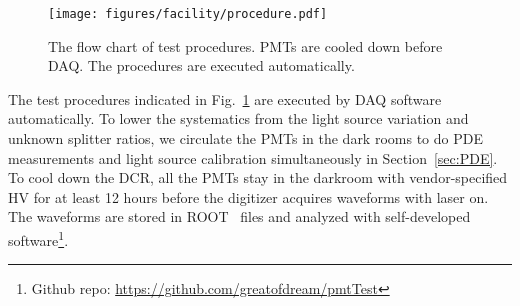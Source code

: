 \begin{figure}
    \centering
    \texttt{[image: figures/facility/procedure.pdf]}
    \caption{The flow chart of test procedures. PMTs are cooled down before DAQ. The procedures are executed automatically.}
    \label{fig:testingprocedure}
\end{figure}

The test procedures indicated in Fig.~\ref{fig:testingprocedure} are executed by DAQ software automatically. To lower the systematics from the light source variation and unknown splitter ratios, we circulate the PMTs in the dark rooms to do PDE measurements and light source calibration simultaneously in Section~\ref{sec:PDE}. To cool down the DCR, all the PMTs stay in the darkroom with vendor-specified HV for at least 12 hours before the digitizer acquires waveforms with laser on. The waveforms are stored in ROOT~\cite{brun_root_1997} files and analyzed with self-developed software\footnote{Github repo: \url{https://github.com/greatofdream/pmtTest}}.
